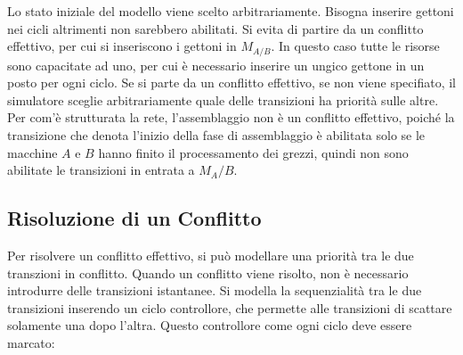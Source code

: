 \documentclass{article}
\numberwithin{equation}{subsection}
\begin{document}
\begin{center}
\end{center}

Lo stato iniziale del modello viene scelto arbitrariamente. Bisogna inserire gettoni nei cicli altrimenti non sarebbero abilitati. Si evita di partire da un conflitto 
effettivo, per cui si inseriscono i gettoni in $M_{A/B}$. In questo caso tutte le risorse sono capacitate ad uno, per cui è necessario inserire un ungico gettone in un 
posto per ogni ciclo. Se si parte da un conflitto effettivo, se non viene specifiato, il simulatore sceglie arbitrariamente quale delle transizioni ha priorità sulle 
altre. Per com'è strutturata la rete, l'assemblaggio non è un conflitto effettivo, poiché la transizione che denota l'inizio della fase di assemblaggio è abilitata solo se 
le macchine $A$ e $B$ hanno finito il processamento dei grezzi, quindi non sono abilitate le transizioni in entrata a $M_A/B$. 

\subsection{Risoluzione di un Conflitto}

Per risolvere un conflitto effettivo, si può modellare una priorità tra le due transzioni in conflitto. Quando un conflitto viene risolto, non è necessario 
introdurre delle transizioni istantanee. 
Si modella la sequenzialità tra le due transizioni inserendo un ciclo controllore, che permette alle transizioni di scattare solamente una dopo l'altra. Questo 
controllore come ogni ciclo deve essere marcato: 
\end{document}
